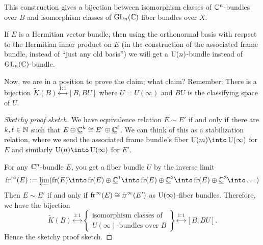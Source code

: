 \begin{remark}
This construction gives a bijection between isomorphism classes of
$\mathbb{C}^{n}$-bundles over $B$ and isomorphism classes of $\operatorname{GL}_{n}(\mathbb{C})$
fiber bundles over $X$.
\end{remark}

\begin{fact}
If $E$ is a Hermitian vector bundle, then using the orthonormal basis
with respect to the Hermitian inner product on $E$ (in the
construction of the associated frame bundle, instead of ``just any old
basis'') we will get a $\operatorname{U}(n)$-bundle instead of $\operatorname{GL}_{n}(\mathbb{C})$-bundle.
\end{fact}

\begin{recall}
Now, we are in a position to prove the claim; what claim? Remember: There is a bijection $\widetilde{K}(B)\stackrel{1:1}{\longleftrightarrow}[B,BU]$
where $U=U(\infty)$ and $BU$ is the classifying space of $U$.
\end{recall}

\begin{proof}[Sketchy proof sketch]
We have equivalence relation
$E\sim E'$ if and only if there are $k,\ell\in\mathbb{N}$ such that
$E\oplus\underline{\mathbb{C}}^{k}\cong E'\oplus\underline{\mathbb{C}}^{\ell}$.
We can think of this as a stabilization relation, where we send the
associated frame bundle's fiber $\U(m)\into\U(\infty)$ for $E$ and
similarly $\U(n)\into\U(\infty)$ for $E'$.

For any $\mathbb{C}^{n}$-bundle $E$, you get a fiber bundle $U$ by the
inverse limit
\begin{equation}
\AssocFrameBundle^{\infty}(E):=\varprojlim(\AssocFrameBundle(E)\into\AssocFrameBundle(E)\oplus\TrivialBundle{\CC}^{1}\into\AssocFrameBundle(E)\oplus\TrivialBundle{\CC}^{2}\into\AssocFrameBundle(E)\oplus\TrivialBundle{\CC}^{3}\into\dots)
\end{equation}
Then $E\sim E'$ if and only if $\operatorname{fr}^{\infty}(E)\cong\operatorname{fr}^{\infty}(E')$
as $\operatorname{U}(\infty)$-fiber bundles. Therefore, we have the bijection
\begin{equation}
\widetilde{K}(B)\stackrel{1:1}{\longleftrightarrow}\left\{\begin{matrix}\mbox{isomorphism classes of}\\ 
U(\infty)\mbox{-bundles over } B\end{matrix}\right\}\stackrel{1:1}{\longleftrightarrow}[B,BU].
\end{equation}
Hence the sketchy proof sketch.
\end{proof}

